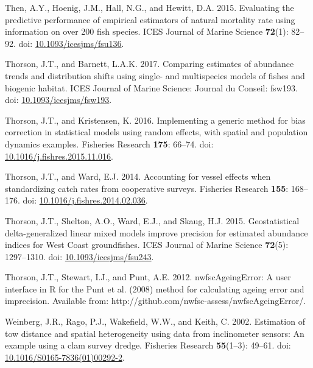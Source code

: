 \documentclass[12pt,]{article}
\begin{document}
\hypertarget{ref-then_evaluating_2015}{}
Then, A.Y., Hoenig, J.M., Hall, N.G., and Hewitt, D.A. 2015. Evaluating
the predictive performance of empirical estimators of natural mortality
rate using information on over 200 fish species. ICES Journal of Marine
Science \textbf{72}(1): 82--92. doi:
\href{https://doi.org/10.1093/icesjms/fsu136}{10.1093/icesjms/fsu136}.

\hypertarget{ref-thorson_comparing_2017}{}
Thorson, J.T., and Barnett, L.A.K. 2017. Comparing estimates of
abundance trends and distribution shifts using single- and multispecies
models of fishes and biogenic habitat. ICES Journal of Marine Science:
Journal du Conseil: fsw193. doi:
\href{https://doi.org/10.1093/icesjms/fsw193}{10.1093/icesjms/fsw193}.

\hypertarget{ref-thorson_implementing_2016}{}
Thorson, J.T., and Kristensen, K. 2016. Implementing a generic method
for bias correction in statistical models using random effects, with
spatial and population dynamics examples. Fisheries Research
\textbf{175}: 66--74. doi:
\href{https://doi.org/10.1016/j.fishres.2015.11.016}{10.1016/j.fishres.2015.11.016}.

\hypertarget{ref-thorson_accounting_2014}{}
Thorson, J.T., and Ward, E.J. 2014. Accounting for vessel effects when
standardizing catch rates from cooperative surveys. Fisheries Research
\textbf{155}: 168--176. doi:
\href{https://doi.org/10.1016/j.fishres.2014.02.036}{10.1016/j.fishres.2014.02.036}.

\hypertarget{ref-thorson_geostatistical_2015}{}
Thorson, J.T., Shelton, A.O., Ward, E.J., and Skaug, H.J. 2015.
Geostatistical delta-generalized linear mixed models improve precision
for estimated abundance indices for West Coast groundfishes. ICES
Journal of Marine Science \textbf{72}(5): 1297--1310. doi:
\href{https://doi.org/10.1093/icesjms/fsu243}{10.1093/icesjms/fsu243}.

\hypertarget{ref-thorson_nwfscageingerror:_2012}{}
Thorson, J.T., Stewart, I.J., and Punt, A.E. 2012. nwfscAgeingError: A
user interface in R for the Punt et al. (2008) method for calculating
ageing error and imprecision. Available from:
http://github.com/nwfsc-assess/nwfscAgeingError/.

\hypertarget{ref-weinberg_estimation_2002}{}
Weinberg, J.R., Rago, P.J., Wakefield, W.W., and Keith, C. 2002.
Estimation of tow distance and spatial heterogeneity using data from
inclinometer sensors: An example using a clam survey dredge. Fisheries
Research \textbf{55}(1--3): 49--61. doi:
\href{https://doi.org/10.1016/S0165-7836(01)00292-2}{10.1016/S0165-7836(01)00292-2}.
\end{document}
